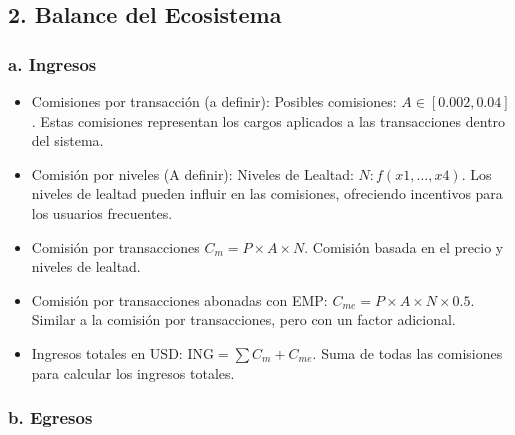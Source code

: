 \documentclass{article}
\begin{document}
\subsection*{2. Balance del Ecosistema}
\subsubsection*{a. Ingresos}
\begin{itemize}
    \item Comisiones por transacción (a definir): Posibles comisiones: \( A \in [0.002, 0.04] \). Estas comisiones representan los cargos aplicados a las transacciones dentro del sistema.
    \item Comisión por niveles (A definir): Niveles de Lealtad: \( N: f(x1,\ldots,x4) \). Los niveles de lealtad pueden influir en las comisiones, ofreciendo incentivos para los usuarios frecuentes.
    \item Comisión por transacciones \( C_m = P \times A \times N \). Comisión  basada en el precio y niveles de lealtad.
    \item Comisión por transacciones abonadas con EMP: \( C_{me} = P \times A \times N \times 0.5 \). Similar a la comisión por transacciones, pero con un factor adicional.
    \item Ingresos totales en USD: \( \text{ING} = \sum C_m + C_{me} \). Suma de todas las comisiones para calcular los ingresos totales.
\end{itemize}
\subsubsection*{b. Egresos}
\end{document}
